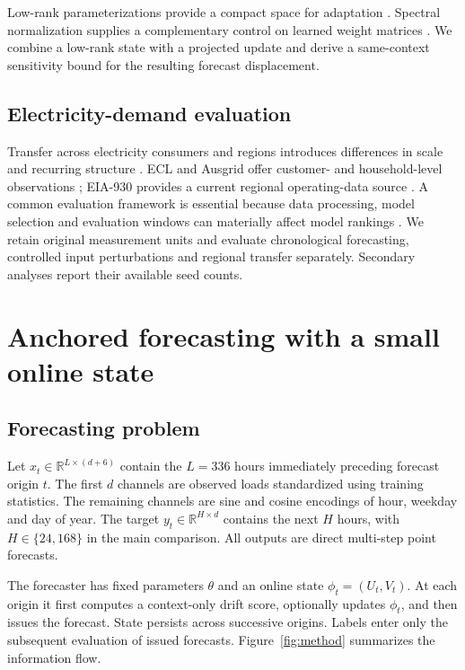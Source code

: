 \documentclass[final,5p,times]{elsarticle}
\newcommand{\R}{\mathbb{R}}
\begin{document}
Low-rank parameterizations provide a compact space for adaptation \cite{hu2021lora,ding2023peft}. Spectral normalization supplies a complementary control on learned weight matrices \cite{miyato2018spectral}. We combine a low-rank state with a projected update and derive a same-context sensitivity bound for the resulting forecast displacement.

\subsection{Electricity-demand evaluation}
Transfer across electricity consumers and regions introduces differences in scale and recurring structure \cite{antoniadis2024hierarchical}. ECL and Ausgrid offer customer- and household-level observations \cite{uci2015ecl,ratnam2015ausgrid}; EIA-930 provides a current regional operating-data source \cite{eia9302026}. A common evaluation framework is essential because data processing, model selection and evaluation windows can materially affect model rankings \cite{qiu2024tfb}. We retain original measurement units and evaluate chronological forecasting, controlled input perturbations and regional transfer separately. Secondary analyses report their available seed counts.

\section{Anchored forecasting with a small online state}
\subsection{Forecasting problem}
Let $x_t\in\R^{L\times(d+6)}$ contain the $L=336$ hours immediately preceding forecast origin $t$. The first $d$ channels are observed loads standardized using training statistics. The remaining channels are sine and cosine encodings of hour, weekday and day of year. The target $y_t\in\R^{H\times d}$ contains the next $H$ hours, with $H\in\{24,168\}$ in the main comparison. All outputs are direct multi-step point forecasts.

The forecaster has fixed parameters $\theta$ and an online state $\phi_t=(U_t,V_t)$. At each origin it first computes a context-only drift score, optionally updates $\phi_t$, and then issues the forecast. State persists across successive origins. Labels enter only the subsequent evaluation of issued forecasts. Figure~\ref{fig:method} summarizes the information flow.
\end{document}
